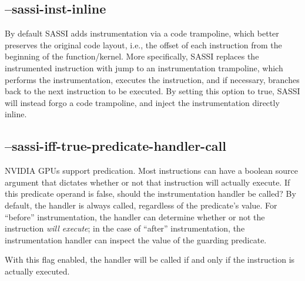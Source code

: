 \subsection{--sassi-inst-inline}

By default SASSI adds instrumentation via a code trampoline, which
better preserves the original code layout, i.e., the offset of each
instruction from the beginning of the function/kernel.  More
specifically, SASSI replaces the instrumented instruction with jump to
an instrumentation trampoline, which performs the instrumentation,
executes the instruction, and if necessary, branches back to the next
instruction to be executed. By setting this option to true, SASSI will
instead forgo a code trampoline, and inject the instrumentation
directly inline.

\subsection{--sassi-iff-true-predicate-handler-call}

NVIDIA GPUs support predication.  Most instructions can have a
boolean source argument that dictates whether or not that instruction
will actually execute.  If this predicate operand is false, should the
instrumentation handler be called?  By default, the handler is always
called, regardless of the predicate's value.  For ``before''
instrumentation, the handler can determine whether or not the
instruction \emph{will execute}; in the case of ``after''
instrumentation, the instrumentation handler can inspect the value of
the guarding predicate.

With this flag enabled, the handler will be called if and only
if the instruction is actually executed.

